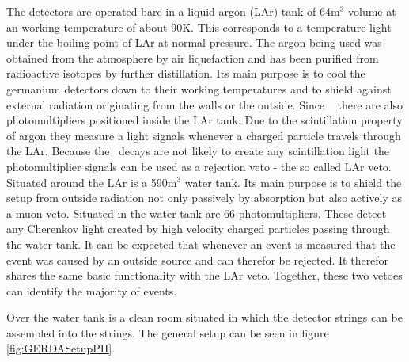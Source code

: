 \documentclass[encoding=utf8,british]{tumphthesis}
\begin{document}
The detectors are operated bare in a liquid argon (LAr) tank of 64m$^3$ volume at an working temperature of about 90K.
This corresponds to a temperature light under the boiling point of LAr at normal pressure.
The argon being used was obtained from the atmosphere by air liquefaction and has been purified from radioactive isotopes by further distillation.
Its main purpose is to cool the germanium detectors down to their working temperatures and to shield against external radiation originating from the walls or the outside. 
Since \PII~ there are also photomultipliers positioned inside the LAr tank.
Due to the scintillation property of argon they measure a light signals whenever a charged particle travels through the LAr.
Because the \onbb\ decays are not likely to create any scintillation light the photomultiplier signals can be used as a rejection veto - the so called LAr veto.
\\

Situated around the LAr is a 590m$^3$ water tank.
Its main purpose is to shield the setup from outside radiation not only passively by absorption but also actively as a muon veto.
Situated in the water tank are 66 photomultipliers.
These detect any Cherenkov light created by high velocity charged particles passing through the water tank.
It can be expected that whenever an event is measured that the event was caused by an outside source and can therefor be rejected.
It therefor shares the same basic functionality with the LAr veto.   
Together, these two vetoes can identify  the majority of events.


Over the water tank is a clean room situated in which the detector strings can be assembled into the strings.  
The general setup can be seen in figure \ref{fig:GERDASetupPII}.
\\
\end{document}
